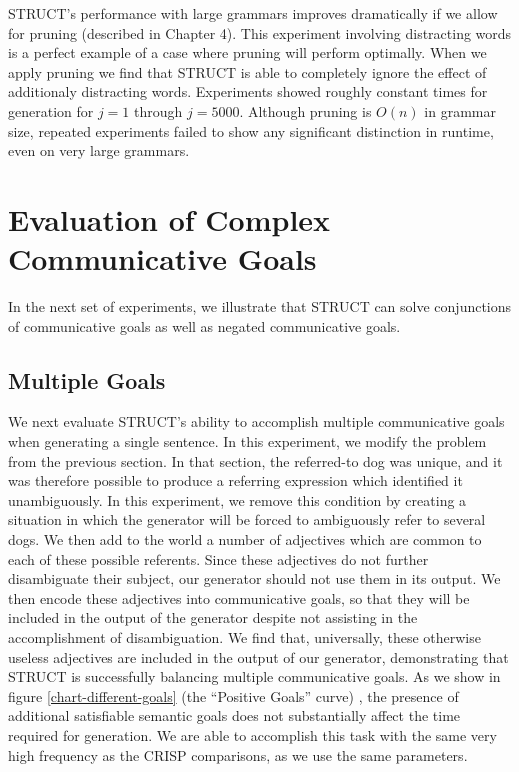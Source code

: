 STRUCT's performance with large grammars improves dramatically if
we allow for pruning (described in Chapter 4).  This experiment involving distracting words
is a perfect example of a case where pruning will perform optimally.
When we apply pruning we find that STRUCT is able to completely ignore the effect of
additionaly distracting words.  Experiments showed roughly constant times for generation
for $j=1$ through $j=5000$.  Although pruning is $O(n)$ in grammar size, repeated experiments
failed to show any significant distinction in runtime, even on very large grammars.

\section{Evaluation of Complex Communicative Goals}
In the next set of experiments, we illustrate that STRUCT can solve
conjunctions of communicative goals as well as negated communicative goals.

\subsection{Multiple Goals}
We next evaluate STRUCT's ability to accomplish
multiple communicative goals when generating a single sentence.  In this
experiment, we modify the problem from the 
previous section.  In that section, the referred-to dog was unique,
and it was therefore possible to produce a referring expression which
identified it unambiguously.  In this experiment, we remove this
condition by creating a situation in which the generator will be
forced to ambiguously refer to several dogs.  We then add to the
world a number of adjectives which are common to each of these
possible referents.  Since these adjectives do not further
disambiguate their subject, our generator should not use
them in its output.  We then encode these adjectives into
communicative goals, so that they will be included in the output of
the generator despite not assisting in the accomplishment of
disambiguation.  We find that, universally, these otherwise useless
adjectives are included in the output of our generator, demonstrating
that STRUCT is successfully balancing multiple communicative goals.
As we show in figure \ref{chart-different-goals} (the ``Positive
Goals'' curve) , the presence of additional satisfiable semantic goals does
not substantially affect the time required for generation.  We are able to
accomplish this task with the same very high frequency as the CRISP
comparisons, as we use the same parameters.

